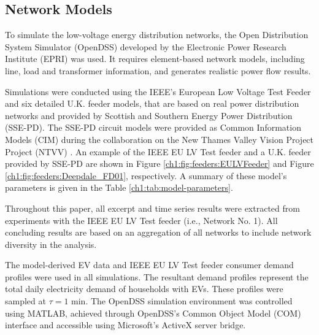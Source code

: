 

\subsection{Network Models}

To simulate the low-voltage energy distribution networks, the Open Distribution System Simulator (OpenDSS) developed by the Electronic Power Research Institute (EPRI) was used. It requires element-based network models, including line, load and transformer information, and generates realistic power flow results.



Simulations were conducted using the IEEE's European Low Voltage Test Feeder \cite{EULVFeeder2015} and six detailed U.K. feeder models, that are based on real power distribution networks and provided by Scottish and Southern Energy Power Distribution (SSE-PD). The SSE-PD circuit models were provided as Common Information Models (CIM) during the collaboration on the New Thames Valley Vision Project Project (NTVV) \cite{NTVV2016}. An example of the IEEE EU LV Test feeder and a U.K. feeder provided by SSE-PD are shown in Figure \ref{ch1:fig:feeders:EULVFeeder} and Figure \ref{ch1:fig:feeders:Deepdale_FD01}, respectively. A summary of these model's parameters is given in the Table \ref{ch1:tab:model-parameters}.




Throughout this paper, all excerpt and time series results were extracted from experiments with the IEEE EU LV Test feeder (i.e., Network No. 1). All concluding results are based on an aggregation of all networks to include network diversity in the analysis.

The model-derived EV data and IEEE EU LV Test feeder consumer demand profiles were used in all simulations. The resultant demand profiles represent the total daily electricity demand of households with EVs. These profiles were sampled at $\tau = 1\text{ min}$. The OpenDSS simulation environment was controlled using MATLAB, achieved through OpenDSS's Common Object Model (COM) interface and accessible using Microsoft's ActiveX server bridge.